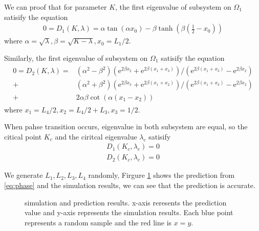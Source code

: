\documentclass[12pt,a4paper]{article}
\begin{document}
We can proof that for parameter $K$, the first eigenvalue of subsystem on $\Omega_1$ satisify the equation
\begin{align}\label{eq:phase1}
0 = D_1(K, \lambda) = \alpha \tan(\alpha x_0) - \beta \tanh(\beta (\frac12 - x_0))
\end{align}
where $\alpha = \sqrt{\lambda}, \beta = \sqrt{K - \lambda}, x_0 = L_1 / 2$.

Similarly, the first eigenvalue of subsystem on $\Omega_1$ satisify the equation
\begin{align}\label{eq:phase2}
\begin{split}
0 = D_2(K, \lambda) = & (\alpha^2 - \beta^2)(\mathrm{e}^{2 \beta x_2} + \mathrm{e}^{2 \beta (x_1+x_3)}) / (\mathrm{e}^{2 \beta (x_1+x_3)} - \mathrm{e}^{2 \beta x_2}) \\
+ & (\alpha^2 + \beta^2)(\mathrm{e}^{2 \beta x_3} + \mathrm{e}^{2 \beta (x_1+x_2)}) / (\mathrm{e}^{2 \beta (x_1+x_3)} - \mathrm{e}^{2 \beta x_2}) \\
+ & 2 \alpha \beta \cot(\alpha (x_1 - x_2))
\end{split}
\end{align}
where $x_1 = L_4 / 2, x_2 = L_4 / 2 + L_3, x_3 = 1 / 2$.

When pahse transition occurs, eigenvalue in both subsystem are equal, so the citical point $K_c$ and the ciritcal eigenvalue $\lambda_c$ satisify
\begin{align}\label{eq:phase}
D_1(K_c, \lambda_c) = 0 \\
D_2(K_c, \lambda_c) = 0
\end{align}

We generate $L_1, L_2, L_3, L_4$ randomly, Firgure \ref{fig:13} shows the prediction from \ref{eq:phase} and the simulation results, we can see that the prediction is accurate.
\begin{figure}[h]
\centering
{}
\caption{simulation and prediction results. x-axis reresents the prediction value and y-axis represents the simulation  results. Each blue point represents a random sample and the red line is $x=y$.}
\label{fig:13}
\end{figure}
\end{document}
